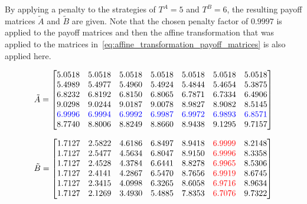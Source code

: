 By applying a penalty to the strategies of \(T^A = 5\) and \(T^B = 6\), the
resulting payoff matrices \(\tilde{A}\) and \(\tilde{B}\) are given.
Note that the chosen penalty factor of \(0.9997\) is applied to the payoff
matrices and then the affine transformation that was applied to the matrices
in~\eqref{eq:affine_transformation_payoff_matrices} is also applied here.

\begin{equation*}
    \tilde{A} = 
    \begin{bmatrix}
        5.0518 & 5.0518 & 5.0518 & 5.0518 & 5.0518 &
        5.0518 & 5.0518  \\
        5.4989 & 5.4977 & 5.4960 & 5.4924 & 5.4844 &
        5.4654 & 5.3875 \\
        6.8232 & 6.8192 & 6.8150 & 6.8065 & 6.7871 &
        6.7334 & 6.4906 \\
        9.0298 & 9.0244 & 9.0187 & 9.0078 & 8.9827 &
        8.9082 & 8.5145 \\
        \color{blue}{6.9996} & \color{blue}{6.9994} & \color{blue}{6.9992} &
        \color{blue}{6.9987} & \color{blue}{6.9972} & \color{blue}{6.9893} &
        \color{blue}{6.8571} \\
        8.7740 & 8.8006 & 8.8249 & 8.8660 & 8.9438 &
        9.1295 & 9.7157 \\
    \end{bmatrix}
\end{equation*}


\begin{equation*}
    \tilde{B} = 
    \begin{bmatrix}
        1.7127 & 2.5822 & 4.6186 & 6.8497 & 8.9418 &
        \color{red}{6.9999} & 8.2148 \\
        1.7127 & 2.5477 & 4.5634 & 6.8047 & 8.9150 &
        \color{red}{6.9996} & 8.3358 \\
        1.7127 & 2.4528   & 4.3784 & 6.6441 & 8.8278 &
        \color{red}{6.9965} & 8.5306 \\
        1.7127 & 2.4141 & 4.2867 & 6.5470 & 8.7656 &
        \color{red}{6.9919} & 8.6745 \\
        1.7127 & 2.3415 & 4.0998 & 6.3265 & 8.6058 &
        \color{red}{6.9716} & 8.9634  \\
        1.7127 & 2.1269 & 3.4930 & 5.4885 & 7.8353 &
        \color{red}{6.7076} & 9.7322 \\
    \end{bmatrix}
\end{equation*}


